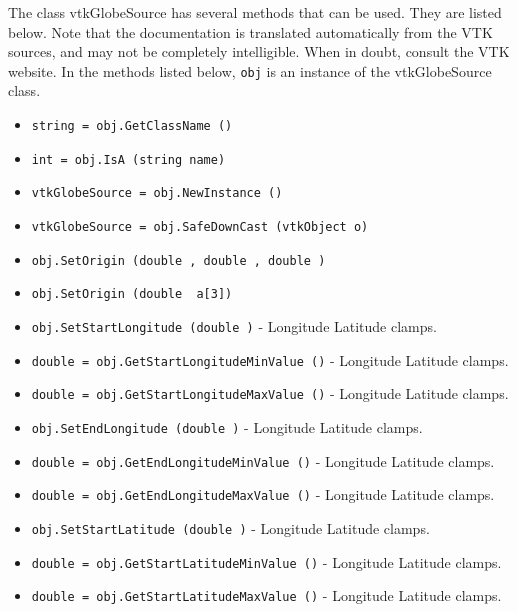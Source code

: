 The class vtkGlobeSource has several methods that can be used.
  They are listed below.
Note that the documentation is translated automatically from the VTK sources,
and may not be completely intelligible.  When in doubt, consult the VTK website.
In the methods listed below, \verb|obj| is an instance of the vtkGlobeSource class.
\begin{itemize}
\item  \verb|string = obj.GetClassName ()|

\item  \verb|int = obj.IsA (string name)|

\item  \verb|vtkGlobeSource = obj.NewInstance ()|

\item  \verb|vtkGlobeSource = obj.SafeDownCast (vtkObject o)|

\item  \verb|obj.SetOrigin (double , double , double )|

\item  \verb|obj.SetOrigin (double  a[3])|

\item  \verb|obj.SetStartLongitude (double )| -  Longitude Latitude clamps.

\item  \verb|double = obj.GetStartLongitudeMinValue ()| -  Longitude Latitude clamps.

\item  \verb|double = obj.GetStartLongitudeMaxValue ()| -  Longitude Latitude clamps.

\item  \verb|obj.SetEndLongitude (double )| -  Longitude Latitude clamps.

\item  \verb|double = obj.GetEndLongitudeMinValue ()| -  Longitude Latitude clamps.

\item  \verb|double = obj.GetEndLongitudeMaxValue ()| -  Longitude Latitude clamps.

\item  \verb|obj.SetStartLatitude (double )| -  Longitude Latitude clamps.

\item  \verb|double = obj.GetStartLatitudeMinValue ()| -  Longitude Latitude clamps.

\item  \verb|double = obj.GetStartLatitudeMaxValue ()| -  Longitude Latitude clamps.


\end{itemize}
